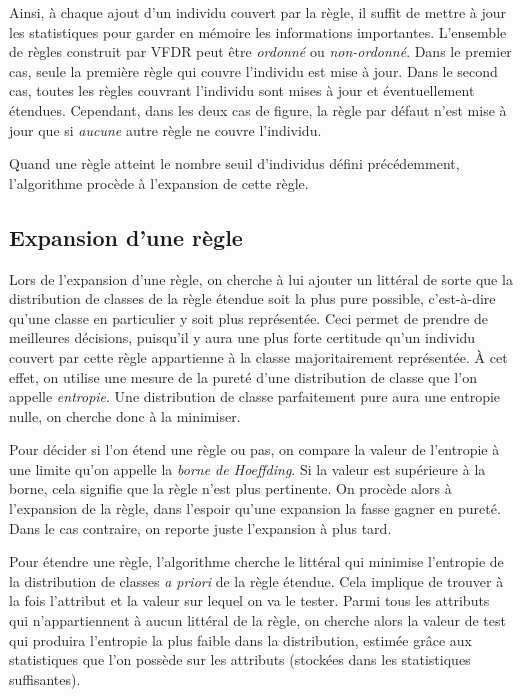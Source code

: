             Ainsi, à chaque ajout d’un individu couvert par la règle, il suffit de mettre à jour les statistiques pour garder en mémoire les informations importantes. L’ensemble de règles construit par VFDR peut être \emph{ordonné} ou \emph{non-ordonné}. Dans le premier cas, seule la première règle qui couvre l’individu est mise à jour. Dans le second cas, toutes les règles couvrant l’individu sont mises à jour et éventuellement étendues. Cependant, dans les deux cas de figure, la règle par défaut n’est mise à jour que si \emph{aucune} autre règle ne couvre l’individu.

            Quand une règle atteint le nombre seuil d’individus défini précédemment, l’algorithme procède à l'expansion de cette règle.

        \subsection{Expansion d'une règle}

            Lors de l’expansion d’une règle, on cherche à lui ajouter un littéral de sorte que la distribution de classes de la règle étendue soit la plus pure possible, c’est-à-dire qu’une classe en particulier y soit plus représentée. Ceci permet de prendre de meilleures décisions, puisqu’il y aura une plus forte certitude qu’un individu couvert par cette règle appartienne à la classe majoritairement représentée. À cet effet, on utilise une mesure de la pureté d’une distribution de classe que l’on appelle \emph{entropie}. Une distribution de classe parfaitement pure aura une entropie nulle, on cherche donc à la minimiser.
            
            Pour décider si l'on étend une règle ou pas, on compare la valeur de l'entropie à une limite qu'on appelle la \emph{borne de Hoeffding}. Si la valeur est supérieure à la borne, cela signifie que la règle n'est plus pertinente. On procède alors à l'expansion de la règle, dans l'espoir qu'une expansion la fasse gagner en pureté. Dans le cas contraire, on reporte juste l'expansion à plus tard.

            Pour étendre une règle, l’algorithme cherche le littéral qui minimise l’entropie de la distribution de classes \emph{a priori} de la règle étendue. Cela implique de trouver à la fois l’attribut et la valeur sur lequel on va le tester. Parmi tous les attributs qui n’appartiennent à aucun littéral de la règle, on cherche alors la valeur de test qui produira l’entropie la plus faible dans la distribution, estimée grâce aux statistiques que l’on possède sur les attributs (stockées dans les statistiques suffisantes).

